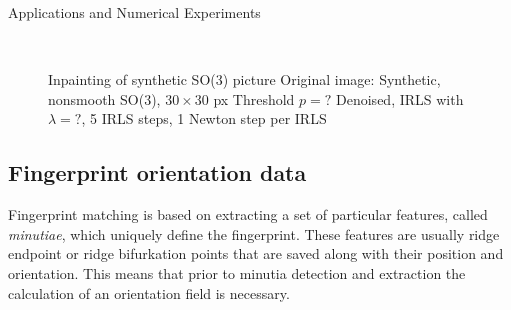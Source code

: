 \begin{chapter}{Applications and Numerical Experiments}
\begin{figure}[h!]
    \centering
    \\
    \caption[Inpainting of synthetic SO(3) picture]{Inpainting of synthetic SO(3) picture
	 Original image: Synthetic, nonsmooth SO(3), $30\times 30$ px
	 Threshold $p=?$
	 Denoised, IRLS with $\lambda=?$, 5 IRLS steps, 1 Newton step per IRLS
	\label{fig:application_so1}
    }
\end{figure}


\FloatBarrier
\subsection{Fingerprint orientation data} %
\label{sub:Fingerprint orientation data}
Fingerprint matching is  based on extracting a set of particular features, called \emph{minutiae}, which uniquely define the fingerprint.
These features are usually ridge endpoint or ridge bifurkation points that are saved along with their position and orientation. This
means that prior to minutia detection and extraction the calculation of an orientation field is necessary.\\


\end{chapter}
